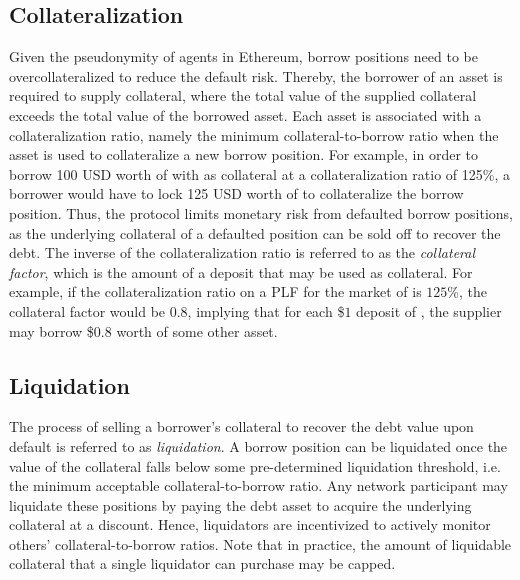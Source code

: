 \subsection{Collateralization}
Given the pseudonymity of agents in Ethereum, borrow positions need to be overcollateralized to reduce the default risk.
Thereby, the borrower of an asset is required to supply collateral, where the total value of the supplied collateral exceeds the total value of the borrowed asset.
Each asset is associated with a collateralization ratio, namely the minimum collateral-to-borrow ratio when the asset is used to collateralize a new borrow position.
For example, in order to borrow 100 USD worth of  with  as collateral at a collateralization ratio of 125\%, a borrower would have to lock 125 USD worth of  to collateralize the borrow position.
Thus, the protocol limits monetary risk from defaulted borrow positions, as the underlying collateral of a defaulted position can be sold off to recover the debt.
The inverse of the collateralization ratio is referred to as the \textit{collateral factor}, which is the amount of a deposit that may be used as collateral.
For example, if the collateralization ratio on a PLF for the market of  is $125$\%, the collateral factor would be $0.8$, implying that for each \$$1$ deposit of , the supplier may borrow \$$0.8$ worth of some other asset.

\subsection{Liquidation}
The process of selling a borrower's collateral to recover the debt value upon default is referred to as \textit{liquidation}.
A borrow position can be liquidated once the value of the collateral falls below some pre-determined liquidation threshold, i.e. the minimum acceptable collateral-to-borrow ratio.
Any network participant may liquidate these positions by paying the debt asset to acquire the underlying collateral at a discount.
Hence, liquidators are incentivized to actively monitor others' collateral-to-borrow ratios. 
Note that in practice, the amount of liquidable collateral that a single liquidator can purchase may be capped.  

